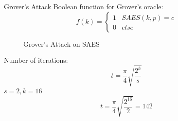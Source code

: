 \begin{frame}{Grover's Attack}
    Boolean function for Grover's oracle:
    \begin{equation*}
     f(k) = 
     \begin{cases} 
          1 & SAES(k, p) = c\\
          0 & else 
      \end{cases}
    \end{equation*}
    \pause
   
    \begin{figure}[h!]
    \begin{center}
\end{center}
    \caption{Grover's Attack on SAES}
    \label{fig:grov18}
\end{figure}
\pause
Number of iterations:
\begin{equation}
    t = \frac{\pi}{4}\sqrt{\frac{2^k}{s}}
\end{equation}
$s = 2, k = 16$
\begin{equation*}
    t = \frac{\pi}{4}\sqrt{\frac{2^{16}}{2}} = 142
\end{equation*}
\end{frame}
